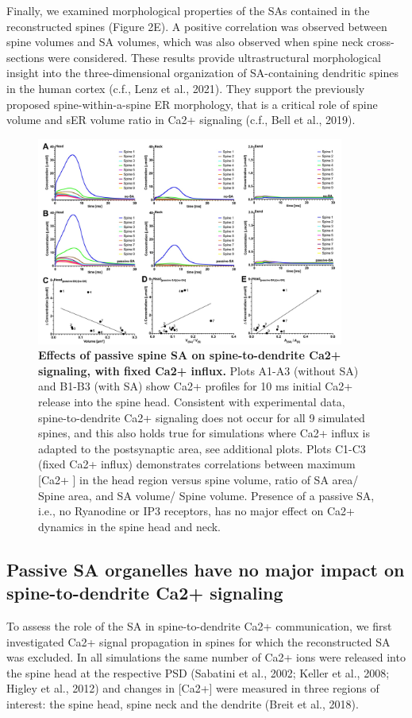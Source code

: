 \documentclass[fleqn,10pt]{wlscirep}
\begin{document}
Finally, we examined morphological properties of the SAs contained in the reconstructed spines (Figure 2E). A positive correlation was observed between spine volumes and SA volumes, which was also observed when spine neck cross-sections were considered. These results provide ultrastructural morphological insight into the three-dimensional organization of SA-containing dendritic spines in the human cortex (c.f., Lenz et al., 2021). They support the previously proposed spine-within-a-spine ER morphology, that is a critical role of spine volume and sER volume ratio in Ca2+ signaling (c.f., Bell et al., 2019). 

\begin{figure}[h!]
\centering
\includegraphics[width=0.9\textwidth]{images/figure3.jpg}
\caption{{\small\textbf{ Effects of passive spine SA on spine-to-dendrite Ca2+ signaling, with fixed Ca2+ influx.}  Plots A1-A3 (without  SA) and B1-B3 (with SA) show Ca2+ profiles for 10 ms initial Ca2+ release into the spine head.  Consistent with experimental data, spine-to-dendrite Ca2+ signaling does not occur for all 9 simulated spines, and this also holds true for simulations where Ca2+ influx is adapted to the postsynaptic area, see additional plots. Plots C1-C3 (fixed Ca2+ influx) demonstrates correlations between maximum [Ca2+ ] in the head region versus spine volume, ratio of SA area/ Spine area, and SA volume/ Spine volume. Presence of a passive SA, i.e., no Ryanodine or IP3 receptors, has no major effect on Ca2+ dynamics in the spine head and neck.}}
\end{figure}

\subsection*{Passive SA organelles have no major impact on spine-to-dendrite Ca2+ signaling} To assess the role of the SA in spine-to-dendrite Ca2+ communication, we first investigated Ca2+ signal propagation in spines for which the reconstructed SA was excluded. In all simulations the same number of Ca2+ ions were released into the spine head at the respective PSD (Sabatini et al., 2002; Keller et al., 2008; Higley et al., 2012) and changes in [Ca2+] were measured in three regions of interest: the spine head, spine neck and the dendrite (Breit et al., 2018).
\end{document}
